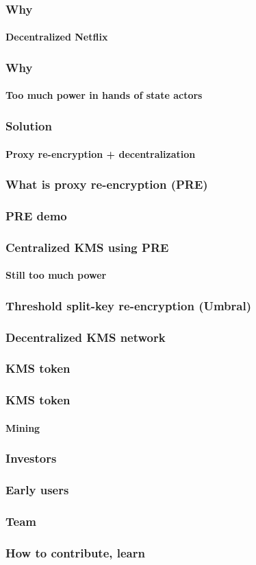 \documentclass[xetex,mathsans,sans]{beamer}
\begin{document}
    \begin{frame}
        \frametitle{Why}
        \framesubtitle{Decentralized Netflix}
    \end{frame}

    \begin{frame}
        \frametitle{Why}
        \framesubtitle{Too much power in hands of state actors}
    \end{frame}

    \begin{frame}
        \frametitle{Solution}
        \framesubtitle{Proxy re-encryption + decentralization}
    \end{frame}

    \begin{frame}
        \frametitle{What is proxy re-encryption (PRE)}
    \end{frame}

    \begin{frame}
        \frametitle{PRE demo}
    \end{frame}

    \begin{frame}
        \frametitle{Centralized KMS using PRE}
        \framesubtitle{Still too much power}
    \end{frame}

    \begin{frame}
        \frametitle{Threshold split-key re-encryption (Umbral)}
    \end{frame}

    \begin{frame}
        \frametitle{Decentralized KMS network}
    \end{frame}

    \begin{frame}
        \frametitle{KMS token}
    \end{frame}

    \begin{frame}
        \frametitle{KMS token}
        \framesubtitle{Mining}
    \end{frame}

    \begin{frame}
        \frametitle{Investors}
    \end{frame}

    \begin{frame}
        \frametitle{Early users}
    \end{frame}

    \begin{frame}
        \frametitle{Team}
    \end{frame}

    \begin{frame}
        \frametitle{How to contribute, learn}
    \end{frame}
\end{document}
